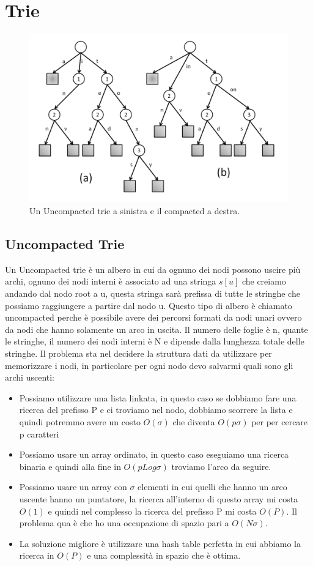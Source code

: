 \documentclass[14pt]{extreport}
\begin{document}
\section{Trie}



\begin{figure}[h!]
\centering
  \includegraphics[width=0.5\linewidth]{CompUnc.png}
  \caption{Un Uncompacted trie a sinistra e il compacted a destra.}
  \label{}
\end{figure}

\subsection{Uncompacted Trie}

Un Uncompacted trie è un albero in cui da ognuno dei nodi possono uscire più archi, ognuno dei nodi interni è associato ad una stringa $s[u]$ che creiamo andando dal nodo root a u, questa stringa sarà prefissa di tutte le stringhe che possiamo raggiungere a partire dal nodo u. Questo tipo di albero è chiamato uncompacted perche è possibile avere dei percorsi formati da nodi unari ovvero da nodi che hanno solamente un arco in uscita. Il numero delle foglie è n, quante le stringhe, il numero dei nodi interni è N e dipende dalla lunghezza totale delle stringhe.
Il problema sta nel decidere la struttura dati da utilizzare per memorizzare i nodi, in particolare per ogni nodo devo salvarmi quali sono gli archi uscenti:
\begin{itemize}
\item Possiamo utilizzare una lista linkata, in questo caso se dobbiamo fare una ricerca del prefisso P e ci troviamo nel nodo, dobbiamo scorrere la lista e quindi potremmo avere un costo $O(\sigma)$ che diventa $O(p\sigma)$ per per cercare p caratteri
\item Possiamo usare un array ordinato, in questo caso eseguiamo una ricerca binaria e quindi alla fine in $O(pLog\sigma)$ troviamo l'arco da seguire.
\item Possiamo usare un array con $\sigma$ elementi in cui quelli che hanno un arco uscente hanno un puntatore, la ricerca all'interno di questo array mi costa $O(1)$ e quindi nel complesso la ricerca del prefisso P mi costa $O(P)$. Il problema qua è che ho una occupazione di spazio pari a $O(N\sigma)$.
\item La soluzione migliore è utilizzare una hash table perfetta in cui abbiamo la ricerca in $O(P)$ e una complessità in spazio che è ottima.
\end{itemize}
\end{document}
